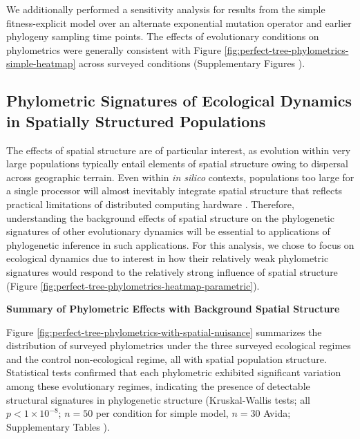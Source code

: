We additionally performed a sensitivity analysis for results from the simple fitness-explicit model over an alternate exponential mutation operator and earlier phylogeny sampling time points.
The effects of evolutionary conditions on phylometrics were generally consistent with Figure \ref{fig:perfect-tree-phylometrics-simple-heatmap} across surveyed conditions (Supplementary Figures ).

\subsection{Phylometric Signatures of Ecological Dynamics in Spatially Structured Populations}



The effects of spatial structure are of particular interest, as evolution within very large populations typically entail elements of spatial structure owing to dispersal across geographic terrain.
Even within \textit{in silico} contexts, populations too large for a single processor will almost inevitably integrate spatial structure that reflects practical limitations of distributed computing hardware \citep{ackley2014indefinitely,moreno2021conduit}.
Therefore, understanding the background effects of spatial structure on the phylogenetic signatures of other evolutionary dynamics will be essential to applications of phylogenetic inference in such applications.
For this analysis, we chose to focus on ecological dynamics due to interest in how their relatively weak phylometric signatures would respond to the relatively strong influence of spatial structure (Figure \ref{fig:perfect-tree-phylometrics-heatmap-parametric}).

\textbf{Summary of Phylometric Effects with Background Spatial Structure}



Figure \ref{fig:perfect-tree-phylometrics-with-spatial-nuisance} summarizes the distribution of surveyed phylometrics under the three surveyed ecological regimes and the control non-ecological regime, all with spatial population structure.
Statistical tests confirmed that each phylometric exhibited significant variation among these evolutionary regimes, indicating the presence of detectable structural signatures in phylogenetic structure (Kruskal-Wallis tests; all $p < 1\times10^{-8}$; $n=50$ per condition for simple model, $n=30$ Avida; Supplementary Tables ).

